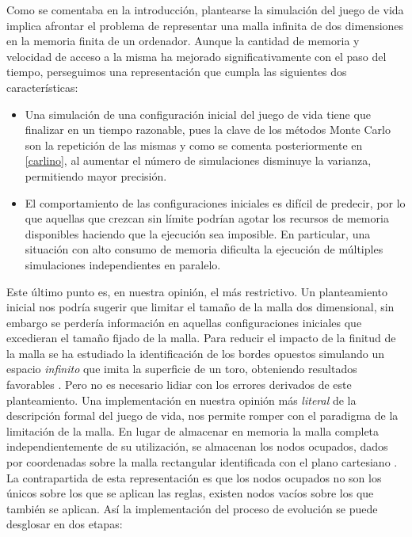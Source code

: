\documentclass[../proyecto.tex]{memoir}
\begin{document}
Como se comentaba en la introducción, plantearse la simulación del juego de vida implica afrontar el problema de representar una malla infinita de dos dimensiones en la memoria finita de un ordenador. Aunque la cantidad de memoria y velocidad de acceso a la misma ha mejorado significativamente con el paso del tiempo, perseguimos una representación que cumpla las siguientes dos características:

\begin{itemize}
\item Una simulación de una configuración inicial del juego de vida tiene que finalizar en un tiempo razonable, pues la clave de los métodos Monte Carlo son la repetición de las mismas y como se comenta posteriormente en \ref{carlino}, al aumentar el número de simulaciones disminuye la varianza, permitiendo mayor precisión.

\item El comportamiento de las configuraciones iniciales es difícil de predecir, por lo que aquellas que crezcan sin límite podrían agotar los recursos de memoria disponibles haciendo que la ejecución sea imposible. En particular, una situación con alto consumo de memoria dificulta la ejecución de múltiples simulaciones independientes en paralelo.
\end{itemize}

Este último punto es, en nuestra opinión, el más restrictivo. Un planteamiento inicial nos podría sugerir que limitar el tamaño de la malla dos dimensional, sin embargo se perdería información en aquellas configuraciones iniciales que excedieran el tamaño fijado de la malla. Para reducir el impacto de la finitud de la malla se ha estudiado la identificación de los bordes opuestos simulando un espacio \textit{infinito} que imita la superficie de un toro, obteniendo resultados favorables \cite{finitudMalla, finitudMalla2}. Pero no es necesario lidiar con los errores derivados de este planteamiento. Una implementación en nuestra opinión más \textit{literal} de la descripción formal del juego de vida, nos permite romper con el paradigma de la limitación de la malla. En lugar de almacenar en memoria la malla completa independientemente de su utilización, se almacenan los nodos ocupados, dados por coordenadas sobre la malla rectangular identificada con el plano cartesiano \cite{boardless}. La contrapartida de esta representación es que los nodos ocupados no son los únicos sobre los que se aplican las reglas, existen nodos vacíos sobre los que también se aplican. Así la implementación del proceso de evolución se puede desglosar en dos etapas:
\end{document}
